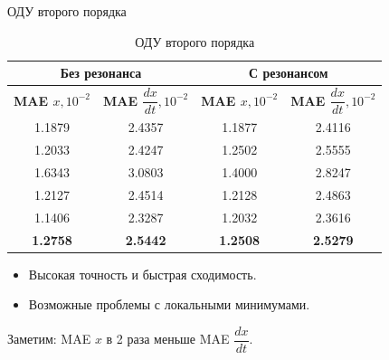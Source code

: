 \documentclass{beamer}
\begin{document}
\begin{frame}{ОДУ второго порядка}
    \begin{table}[h!]
        \centering
        \begin{tabular}{|c|c|c|c|}
        \hline
        \multicolumn{2}{|c|}{\textbf{Без резонанса}} & \multicolumn{2}{|c|}{\textbf{С резонансом}} \\
        \hline
        \textbf{MAE $x, 10^{-2}$} & \textbf{MAE $\dfrac{dx}{dt}, 10^{-2}$} & \textbf{MAE $x, 10^{-2}$} & \textbf{MAE $\dfrac{dx}{dt}, 10^{-2}$} \\
        \hline
        1.1879 & 2.4357 & 1.1877 & 2.4116 \\
        1.2033 & 2.4247 & 1.2502 & 2.5555 \\
        1.6343 & 3.0803 & 1.4000 & 2.8247 \\
        1.2127 & 2.4514 & 1.2128 & 2.4863 \\
        1.1406 & 2.3287 & 1.2032 & 2.3616 \\
        \hline
        \textbf{1.2758} & \textbf{2.5442} & \textbf{1.2508} & \textbf{2.5279} \\
        \hline
        \end{tabular}
        \caption{ОДУ второго порядка}
    \end{table}

    \begin{itemize}
        \item Высокая точность и быстрая сходимость.
        \item Возможные проблемы с локальными минимумами.
    \end{itemize}

    \begin{alertblock}{Заметим:}
        MAE $x$ в 2 раза меньше MAE $\dfrac{dx}{dt}$.
    \end{alertblock}
\end{frame}
\end{document}
